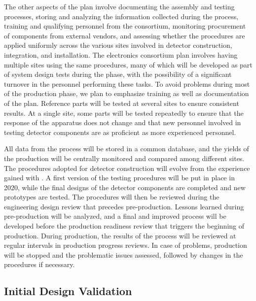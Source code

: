 The other aspects of the  plan involve documenting the 
assembly and testing processes, storing and analyzing the information
collected during the  process, training and qualifying 
personnel from the consortium, monitoring procurement of 
components from external vendors, and assessing whether the
 procedures are applied uniformly across
the various sites involved in detector construction, integration,
and installation. The  electronics consortium plan involves
having multiple sites using the same  procedures,
many of which will be developed as part of system design tests during the  phase,
with the possibility of a significant turnover in the personnel
performing these tasks. To avoid problems during most of the
production phase, we plan to emphasize training as well as documentation
of the  plan. Reference parts will be tested at
several sites to ensure consistent results. At
a single site, some parts will be tested repeatedly to ensure
that the response of the apparatus does not change and
that new personnel involved in testing detector components are 
as proficient as more experienced personnel. 

All data from
the  process will be stored in a common database, and
the yields of the production will be centrally monitored and 
compared among different sites. The procedures adopted
for detector construction will evolve from the experience
gained with . A first version of the testing procedures
will be put in place in 2020, while the final designs of
the detector components are completed and new prototypes are
tested. The  procedures will then be reviewed
during the engineering design review that precedes pre-production. Lessons learned during pre-production
will be analyzed, and a final and improved  process will be 
developed before the production readiness review that triggers
the beginning of production. During production, the results
of the  process will be reviewed at regular intervals
in production progress reviews. In case of problems, production
will be stopped and the problematic issues assessed, 
followed by changes in the procedures if necessary.

\subsection{Initial Design Validation}
\label{sec:fdsp-tpcelec-qa-initial}

